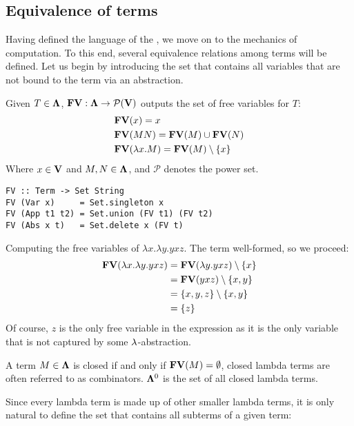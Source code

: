 \documentclass[12pt]{book}
\begin{document}
\subsection{\centering Equivalence of terms}
Having defined the language of the \lcalc, we move on to the mechanics of computation. To this end, several equivalence relations among terms will be defined. Let us begin by introducing the set that contains all variables that are not bound to the term via an abstraction.
\begin{definition} Given $T \in \mathbf{\Lambda} $, $\mathbf{FV} : \mathbf{\Lambda} \to \mathcal{P}(\mathbf{V}) $ outputs the set of free variables for $T$:
  \begin{align*}
    & \mathbf{FV}(x) = {x}\\
    & \mathbf{FV}(MN) = \mathbf{FV}(M) \cup \mathbf{FV}(N) \\
    & \mathbf{FV}(\lambda x . M) = \mathbf{FV}(M) \setminus \{x\}
  \end{align*}
  Where $ x \in \mathbf{V} $ and $ M, N \in \mathbf{\Lambda} $, and $\mathcal{P}$ denotes the power set.
  \begin{lstlisting}[style=haskellstyle,caption={Implementation of FV in Haskell.}]
FV :: Term -> Set String
FV (Var x)     = Set.singleton x
FV (App t1 t2) = Set.union (FV t1) (FV t2)
FV (Abs x t)   = Set.delete x (FV t)
  \end{lstlisting}
\end{definition}
\begin{example} Computing the free variables of $\lambda x . \lambda y . y x z$. The term well-formed, so we proceed:
  \begin{align*}
    \mathbf{FV}(\lambda x . \lambda y . y x z) &= \mathbf{FV}(\lambda y . yxz) \setminus \{x\} \\
                                        &= \mathbf{FV}(yxz) \setminus \{x, y\} \\
                                        &= \{x, y, z\} \setminus \{x, y\} \\
                                        &= \{z\}
  \end{align*}
  Of course, $z$ is the only free variable in the expression as it is the only variable that is not captured by some $\lambda$-abstraction.
\end{example}
\begin{definition}
  A term $M \in \mathbf{\Lambda}$ is closed if and only if $\mathbf{FV}(M) = \emptyset$, closed lambda terms are often referred to as combinators. $\mathbf{\Lambda}^0$ is the set of all closed lambda terms.
\end{definition}
Since every lambda term is made up of other smaller lambda terms, it is only natural to define the set that contains all subterms of a given term:
\end{document}
